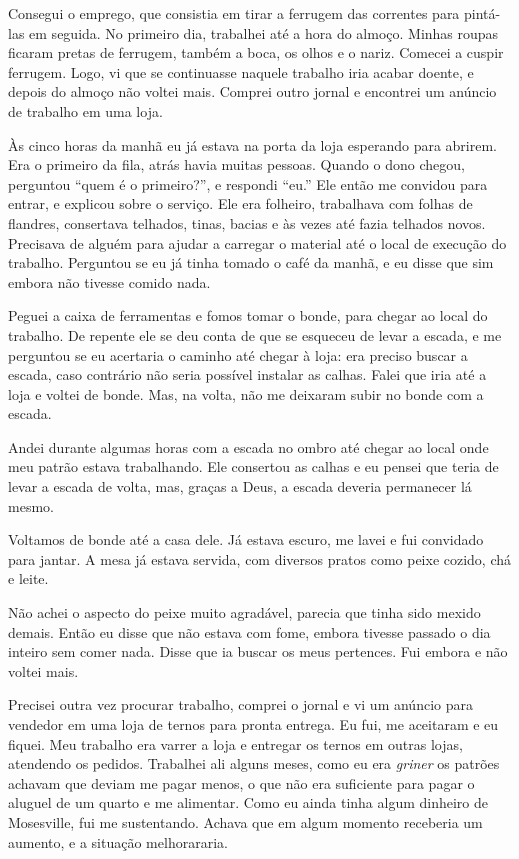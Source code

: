 Consegui o emprego, que consistia em tirar a ferrugem das
correntes para pintá-las em seguida. No primeiro dia, trabalhei até a hora
do almoço. Minhas roupas ficaram pretas de ferrugem, também a boca,
os olhos e o nariz. Comecei a cuspir ferrugem. Logo, vi que se
continuasse naquele trabalho iria acabar doente, e depois do
almoço não voltei mais. Comprei outro jornal e encontrei um anúncio de trabalho em uma loja.

Às cinco horas da manhã eu já estava na porta da loja esperando para abrirem. Era o primeiro da fila, atrás havia muitas pessoas. Quando o dono chegou, perguntou ``quem é o primeiro?'', e respondi ``eu.'' Ele então me
convidou para entrar, e explicou sobre o serviço. Ele era folheiro, trabalhava com folhas de flandres, consertava
telhados, tinas, bacias e às vezes até fazia telhados novos. Precisava de
alguém para ajudar a carregar o material até o local de execução do trabalho. Perguntou se eu já tinha tomado o café da manhã, e eu disse que sim embora não tivesse comido nada.

Peguei a caixa de ferramentas e fomos tomar o bonde, para chegar ao 
local do trabalho. De repente ele se deu conta de que se esqueceu 
de levar a escada, e me perguntou se eu acertaria o caminho até 
chegar à loja: era preciso buscar a escada, caso contrário não 
seria possível instalar as calhas. Falei que iria até a loja e 
voltei de bonde. Mas, na volta, não me deixaram subir no bonde com a escada.

Andei durante algumas horas com a escada no ombro até chegar ao local
onde meu patrão estava trabalhando. Ele consertou as calhas e eu pensei
que teria de levar a escada de volta, mas, graças a Deus, a escada deveria
permanecer lá mesmo.

Voltamos de bonde até a casa dele. Já estava escuro, me lavei e fui
convidado para jantar. A mesa já estava servida, com diversos
pratos como peixe cozido, chá e leite.

Não achei o aspecto do peixe muito agradável, parecia que tinha sido 
mexido demais. Então eu disse que não estava com fome, embora tivesse
passado o dia inteiro sem comer nada. Disse que ia buscar os meus
pertences. Fui embora e não voltei mais.

Precisei outra vez procurar trabalho, comprei o jornal e vi um anúncio para vendedor em uma loja de ternos para pronta entrega. Eu fui, me aceitaram e eu fiquei. Meu trabalho era varrer a loja e
entregar os ternos em outras lojas, atendendo os pedidos.
Trabalhei ali alguns meses, como eu era \textit{griner} os patrões achavam
que deviam me pagar menos, o que não era suficiente para pagar o aluguel
de um quarto e me alimentar. Como eu ainda tinha algum dinheiro de
Mosesville, fui me sustentando. Achava que em algum momento receberia um aumento, e
a situação melhorararia.

